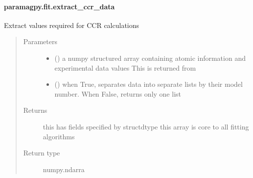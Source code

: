 \documentclass[a4paper,10pt,english,openany,oneside]{sphinxmanual}
\begin{document}
\paragraph{paramagpy.fit.extract\_ccr\_data}
\label{\detokenize{reference/generated/paramagpy.fit.extract_ccr_data:paramagpy-fit-extract-ccr-data}}\label{\detokenize{reference/generated/paramagpy.fit.extract_ccr_data::doc}}

\begin{fulllineitems}
\label{\detokenize{reference/generated/paramagpy.fit.extract_ccr_data:paramagpy.fit.extract_ccr_data}}
Extract values required for CCR calculations
\begin{quote}\begin{description}
\item[{Parameters}] \leavevmode\begin{itemize}
\item {} 
 () \textendash{} a numpy structured array containing atomic information
and experimental data values
This is returned from
{\hyperref[\detokenize{reference/generated/paramagpy.protein.CustomStructure.parse:paramagpy.protein.CustomStructure.parse}]{}}

\item {} 
 (\sphinxstyleliteralemphasis{\sphinxupquote{, }}) \textendash{} when True, separates data into separate lists
by their model number. When False, returns only one list

\end{itemize}

\item[{Returns}] \leavevmode
{} \textendash{} this has fields specified by structdtype
this array is core to all fitting algorithms

\item[{Return type}] \leavevmode
numpy.ndarra

\end{description}\end{quote}

\end{fulllineitems}
\end{document}
